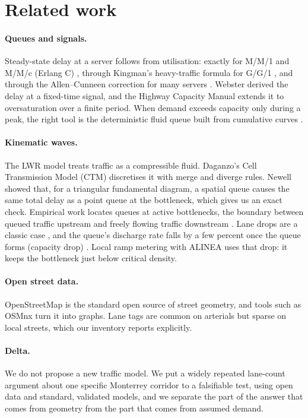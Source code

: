 \section{Related work}
\label{sec:related}

\paragraph{Queues and signals.} Steady-state delay at a server follows
from utilisation: exactly for M/M/1 and M/M/c (Erlang C)
\cite{kleinrock1975queueing}, through Kingman's heavy-traffic formula for
G/G/1 \cite{kingman1961heavy}, and through the Allen--Cunneen correction
for many servers \cite{allen1990probability}. Webster
\cite{webster1958signal} derived the delay at a fixed-time signal, and
the Highway Capacity Manual \cite{hcm2000} extends it to oversaturation
over a finite period. When demand exceeds capacity only during a peak,
the right tool is the deterministic fluid queue built from cumulative
curves \cite{newell1982queueing}.

\paragraph{Kinematic waves.} The LWR model
\cite{lighthill1955kinematic,richards1956shock} treats traffic as a
compressible fluid. Daganzo's Cell Transmission Model (CTM)
\cite{daganzo1994ctm,daganzo1995ctm} discretises it with merge and diverge
rules. Newell \cite{newell1993kinematic} showed that, for a triangular
fundamental diagram, a spatial queue causes the same total delay as a
point queue at the bottleneck, which gives us an exact check. Empirical
work locates queues at active bottlenecks, the boundary between queued
traffic upstream and freely flowing traffic downstream
\cite{cassidy1999bottlenecks}. Lane drops are a classic case
\cite{bertini2005lanedrop}, and the queue's discharge rate falls by a few
percent once the queue forms (capacity drop)
\cite{hall1991capacity,chung2007capacity}. Local ramp metering with ALINEA
\cite{papageorgiou1991alinea} uses that drop: it keeps the bottleneck just
below critical density.

\paragraph{Open street data.} OpenStreetMap \cite{haklay2008osm} is the
standard open source of street geometry, and tools such as OSMnx
\cite{boeing2017osmnx} turn it into graphs. Lane tags are common on
arterials but sparse on local streets, which our inventory reports
explicitly.

\paragraph{Delta.} We do not propose a new traffic model. We put a
widely repeated lane-count argument about one specific Monterrey corridor
to a falsifiable test, using open data and standard, validated models,
and we separate the part of the answer that comes from geometry from the
part that comes from assumed demand.
